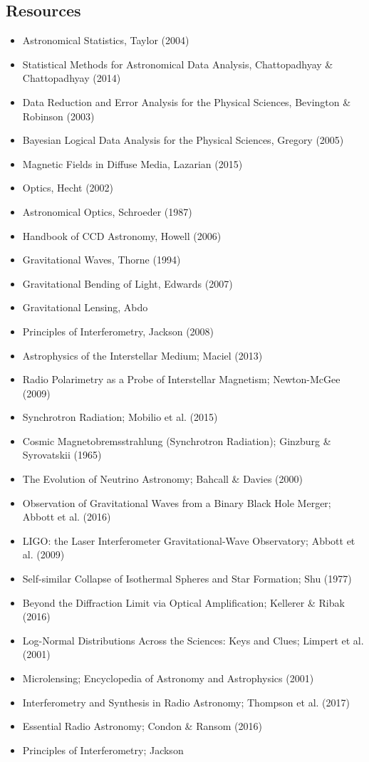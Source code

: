 \documentclass[a4paper,10pt]{article}
\begin{document}
\newpage
\subsection{Resources}

\begin{itemize}
    \item Astronomical Statistics, Taylor (2004)
    \item Statistical Methods for Astronomical Data Analysis, Chattopadhyay \& Chattopadhyay (2014)
    \item Data Reduction and Error Analysis for the Physical Sciences, Bevington \& Robinson (2003)
    \item Bayesian Logical Data Analysis for the Physical Sciences, Gregory (2005)
    \item Magnetic Fields in Diffuse Media, Lazarian (2015)
    \item Optics, Hecht (2002)
    \item Astronomical Optics, Schroeder (1987)
    \item Handbook of CCD Astronomy, Howell (2006)
    \item Gravitational Waves, Thorne (1994)
    \item Gravitational Bending of Light, Edwards (2007)
    \item Gravitational Lensing, Abdo
    \item Principles of Interferometry, Jackson (2008)
    \item Astrophysics of the Interstellar Medium; Maciel (2013)
    \item Radio Polarimetry as a Probe of Interstellar Magnetism; Newton-McGee (2009)
    \item Synchrotron Radiation; Mobilio et al. (2015)
    \item Cosmic Magnetobremsstrahlung (Synchrotron Radiation); Ginzburg \& Syrovatskii (1965)
    \item The Evolution of Neutrino Astronomy; Bahcall \& Davies (2000)
    \item Observation of Gravitational Waves from a Binary Black Hole Merger; Abbott et al. (2016)
    \item LIGO: the Laser Interferometer Gravitational-Wave Observatory; Abbott et al. (2009)
    \item Self-similar Collapse of Isothermal Spheres and Star Formation; Shu (1977)
    \item Beyond the Diffraction Limit via Optical Amplification; Kellerer \& Ribak (2016)
    \item Log-Normal Distributions Across the Sciences: Keys and Clues; Limpert et al. (2001)
    \item Microlensing; Encyclopedia of Astronomy and Astrophysics (2001)
    \item Interferometry and Synthesis in Radio Astronomy; Thompson et al. (2017)
    \item Essential Radio Astronomy; Condon \& Ransom (2016)
    \item Principles of Interferometry; Jackson
\end{itemize}
\end{document}
